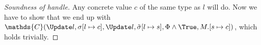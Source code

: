\begin{proof}[Soundness of handle]
{Any concrete value $c$ of the same type as $l$ will do. Now we have to show that we end up with $\mathds{C}(\Update l,\sigma[l\mapsto c],\Update l,\tilde{\sigma}[l\mapsto s],\Phi\land\True,M.[s\mapsto c])$, which holds trivially.




%
%
}
%
%
%
%
%
%
%
%
%
%
%

\end{proof}
